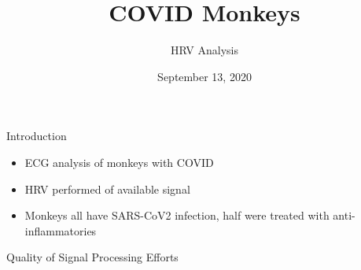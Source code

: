 \documentclass[
  ignorenonframetext,
  unknownkeysallowed]{beamer}
\title{COVID Monkeys}
\subtitle{HRV Analysis}
\author{}
\date{\vspace{-2.5em}September 13, 2020}
\providecommand{\tightlist}{%
  \setlength{\itemsep}{0pt}\setlength{\parskip}{0pt}}
\begin{document}
\frame{\titlepage}

\begin{frame}{Introduction}
\protect\hypertarget{introduction}{}

\begin{itemize}
\tightlist
\item
  ECG analysis of monkeys with COVID
\item
  HRV performed of available signal
\item
  Monkeys all have SARS-CoV2 infection, half were treated with
  anti-inflammatories
\end{itemize}

\end{frame}

\begin{frame}{Quality of Signal Processing Efforts}
\protect\hypertarget{quality-of-signal-processing-efforts}{}

\begin{table}


\end{table}
\end{frame}
\end{document}
